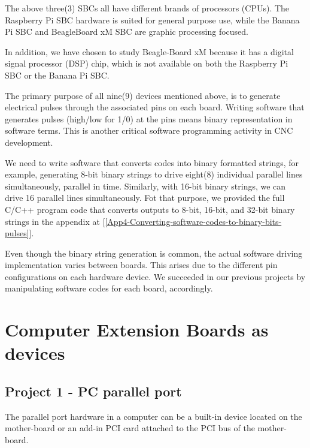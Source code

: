 The above three(3) SBCs all have different brands of processors (CPUs). The Raspberry Pi SBC hardware is suited for general purpose use, while the Banana Pi SBC and BeagleBoard xM SBC are graphic processing focused.
\vspace*{1\baselineskip}

In addition, we have chosen to study Beagle-Board xM  because it has a digital signal processor (DSP) chip, which is not available on both the Raspberry Pi SBC or the Banana Pi SBC.
\vspace*{1\baselineskip}

The primary purpose of all nine(9) devices mentioned above, is to generate electrical pulses through the associated pins on each board. Writing software that generates pulses (high/low for 1/0) at the pins means binary representation in software terms. This is another critical software programming activity in CNC development. 
\vspace*{1\baselineskip}

We need to write software that converts codes into binary formatted strings, for example, generating 8-bit binary strings to drive eight(8) individual parallel lines simultaneously, parallel in time. Similarly, with 16-bit binary strings, we can drive 16 parallel lines simultaneously. Fot that purpose, we provided the full C/C++ program code that converts outputs to 8-bit, 16-bit, and 32-bit binary strings in the appendix at  [\ref{App4-Converting-software-codes-to-binary-bits-pulses}]. 
\vspace*{1\baselineskip}

Even though the binary string generation is common, the actual software driving implementation varies between boards. This arises due to the different pin configurations on each hardware device. We succeeded in our previous projects by manipulating software codes for each board, accordingly.

\section{Computer Extension Boards as devices}

\subsection{Project 1 - PC parallel port}

The parallel port hardware in a computer can be a built-in device located on the mother-board or an add-in PCI card attached to the PCI bus of the mother-board. 
\vspace*{1\baselineskip}

